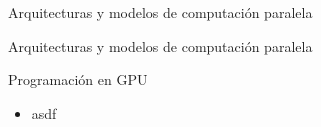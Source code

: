 \begin{frame}
\vfill
\begin{center}
\begin{block}{\begin{center}\begin{Huge}Arquitecturas y modelos de computación paralela\end{Huge}\end{center}}
\end{block}
\end{center}
\end{frame}

\begin{frame}{Arquitecturas y modelos de computación paralela}
\begin{block}{Programación en GPU}
\begin{itemize}
  \item asdf
\end{itemize}
\end{block}
\end{frame}